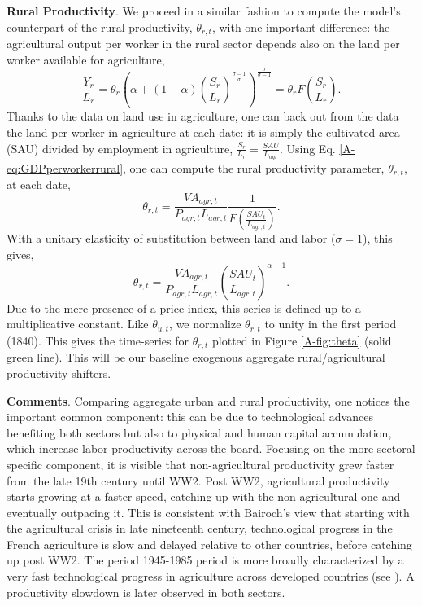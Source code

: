 \documentclass[11pt]{report}
\begin{document}
\noindent \textbf{Rural Productivity}. We proceed in a similar fashion to compute the model's counterpart of the rural productivity, $\theta_{r,t}$, with one important difference: the agricultural output per worker in the rural sector depends also on the land per worker available for agriculture,
\begin{equation}
\frac{Y_r}{L_r}=\theta_r\left(\alpha  +(1-\alpha)(\frac{S_r}{L_r})^{\frac{\sigma-1}{\sigma}} \right)^{\frac{\sigma}{\sigma-1}}=\theta_r F\left(\frac{S_r}{L_r}\right). \label{A-eq:GDPperworkerrural}
\end{equation}
Thanks to the data on land use in agriculture, one can back out from the data the land per worker in agriculture at each date: it is simply the cultivated area (SAU) divided by employment in agriculture, $\frac{S_{r}}{L_{r}}=\frac{SAU}{L_{agr}}$. Using Eq. \ref{A-eq:GDPperworkerrural}, one can compute the rural productivity parameter, $\theta_{r,t}$, at each date,
\begin{equation*}
\theta_{r,t}=\frac{VA_{agr,t}}{P_{agr,t}L_{agr,t}}\frac{1}{F(\frac{SAU_{t}}{L_{agr,t}})}. 
\end{equation*}
With a unitary elasticity of substitution between land and labor ($\sigma=1$), this gives,
\begin{equation*}
\theta_{r,t}=\frac{VA_{agr,t}}{P_{agr,t}L_{agr,t}}\left(\frac{SAU_{t}}{L_{agr,t}}\right)^{\alpha-1}. 
\end{equation*}
Due to the mere presence of a price index, this series is defined up to a multiplicative constant. Like $\theta_{u,t}$, we normalize $\theta_{r,t}$ to unity in the first period (1840). This gives the time-series for $\theta_{r,t}$ plotted in Figure \ref{A-fig:theta} (solid green line). This will be our baseline exogenous aggregate rural/agricultural productivity shifters.

\smallskip

\noindent \textbf{Comments}. Comparing aggregate urban and rural productivity, one notices the important common component: this can be due to technological advances benefiting both sectors but also to physical and human capital accumulation, which increase labor productivity across the board. Focusing on the more sectoral specific component, it is visible that non-agricultural productivity grew faster from the late 19th century until WW2. Post WW2, agricultural productivity starts growing at a faster speed, catching-up with the non-agricultural one and eventually outpacing it. This is consistent with Bairoch's view that starting with the agricultural crisis in late nineteenth century, technological progress in the French agriculture is slow and delayed relative to other countries, before catching up post WW2. The period 1945-1985 period is more broadly characterized by a very fast technological progress in agriculture across developed countries (see \cite{bairoch1989}). A productivity slowdown is later observed in both sectors.
\end{document}
